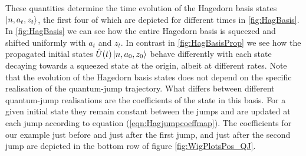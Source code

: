 \documentclass[12pt]{iopart} %
\begin{document}
These quantities determine the time evolution of the Hagedorn basis states $\ket{n,a_t,z_t}$, the first four of which are depicted for different times in \cref{fig:HagBasis}. In \cref{fig:HagBasis} we can see how the entire Hagedorn basis is squeezed and shifted uniformly with $a_t$  and $z_t$. In contrast in \cref{fig:HagBasisProp} we see how the propagated initial states $\hat U(t)\ket{n,a_0,z_0}$ behave differently with each state decaying towards a squeezed state at the origin, albeit at different rates. Note that the evolution of the Hagedorn basis states does not depend on the specific realisation of the quantum-jump trajectory. What differs between different quantum-jump realisations are the coefficients of the state in this basis. For a given initial state they remain constant between the jumps and are updated at each jump according to equation (\ref{eqn:Hagjumpcoeffmap}). The coefficients for our example just before and just after the first jump, and just after the second jump are depicted in the bottom row of figure \ref{fig:WigPlotsPos_QJ}.
\end{document}
